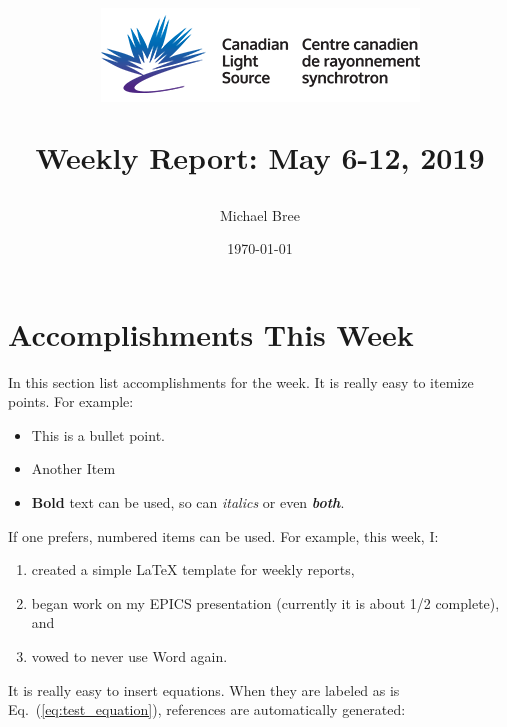 \documentclass[letterpaper,12pt]{article}
\begin{document}
\title{
\begin{center}
\hspace{-1.0em}\includegraphics[scale=0.5]{images/cls-logo-2.png}
\end{center} 
Weekly Report: May 6-12, 2019
\author{Michael Bree}
\date{\today}}
\maketitle


\section{Accomplishments This Week}

In this section list accomplishments for the week. It is really easy to itemize points. For example:
\begin{itemize}
    \item This is a bullet point.
    \item Another Item
    \item \textbf{Bold} text can be used, so can \textit{italics} or even \textbf{\textit{both}}.
\end{itemize}
If one prefers, numbered items can be used.  For example, this week, I:
\begin{enumerate}
    \item created a simple {\LaTeX} template for weekly reports,
    \item began work on my EPICS presentation (currently it is about 1/2 complete), and
    \item vowed to never use Word again.
\end{enumerate}

It is really easy to insert equations.  When they are labeled as is Eq.~(\ref{eq:test_equation}), references are automatically generated:

\end{document}
